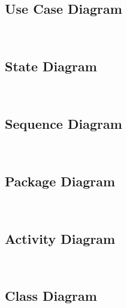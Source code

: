 \subsection{Use Case Diagram}

\\

\subsection{State Diagram}

\\

\subsection{Sequence Diagram}

\\

\subsection{Package Diagram}

\\

\subsection{Activity Diagram}

\\

\subsection{Class Diagram}

\\

